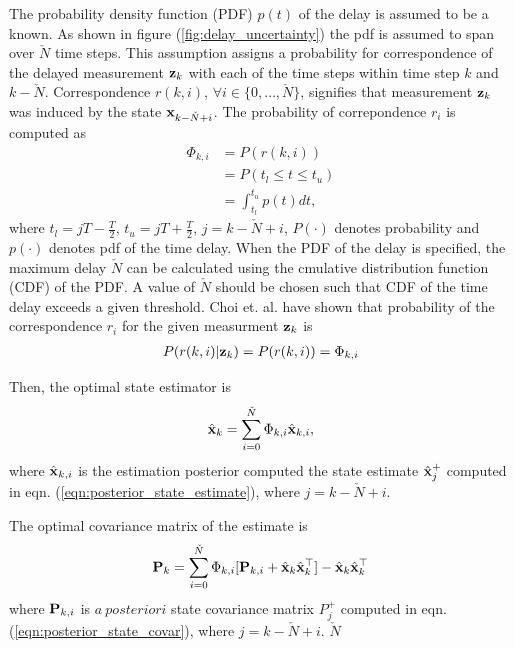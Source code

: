 The probability density function (PDF) $p(t)$ of the delay is assumed to be a known. As shown in figure (\ref{fig:delay_uncertainty}) the pdf is assumed to span over $\check{N}$ time steps. This assumption assigns a probability for correspondence of the delayed measurement $\mathbf{z}_k$ with each of the time steps within time step $k$ and $k- \check{N}$.
Correspondence $r(k,i)$, $\forall i \in \{0, \dots, \check{N}\}$, signifies that measurement $\mathbf{z}_k$ was induced by the state $\mathbf{x}_{k-\check{N}+i}$.
The probability of correpondence $r_i$ is computed as
\begin{align}
	\Phi_{k,i} &= P(r(k,i)) \\
	&= P(t_l \le t \le t_u) \\
	&= \int_{t_l}^{ t_u} p(t) dt,
\end{align}
where $t_l = {jT - \frac{T}{2}}$, $t_u = {j T + \frac{T}{2}}$, $j = k - \check{N} + i $, $P(\cdot)$ denotes probability and $p(\cdot)$ denotes pdf of the time delay. When the PDF of the delay is specified, the maximum delay $\check{N}$ can be calculated using the cmulative distribution function (CDF) of the PDF. 
A value of $\check{N}$ should be chosen such that CDF of the time delay exceeds a given threshold. 
Choi et. al. have shown that probability of the correspondence $r_i$ for the given measurment $\mathbf{z}_k$ is \cite{choi2012state}
\begin{align}
	P(r(k,i) | \mathbf{z}_k ) = P(r(k,i)) = \Phi_{k,i}
\end{align}

Then, the optimal state estimator is
\begin{align}
	\hat{\mathbf{x}}_k = \sum_{i=0}^{\check{N}} \Phi_{k,i} \hat{\mathbf{x}}_{k,i},
\end{align}
where $\hat{\mathbf{x}}_{k,i}$ is the estimation posterior computed the state estimate $\hat{\mathbf{x}}_j^+$ computed in eqn. (\ref{eqn:posterior_state_estimate}), where $j = k - \check{N} + i$.

The optimal covariance matrix of the estimate is
\begin{align}
	\mathbf{P}_k = \sum_{i = 0}^{\check{N}} \Phi_{k,i} [\mathbf{P}_{k,i} + \hat{\mathbf{x}}_k \hat{\mathbf{x}}_k^\top] - \hat{\mathbf{x}}_k \hat{\mathbf{x}}_k^\top	
\end{align}
where $\mathbf{P}_{k,i}$ is $a~posteriori$ state covariance matrix $P_j^+$ computed in eqn. (\ref{eqn:posterior_state_covar}),  where $j = k - \check{N} + i$. $\check{N}$



